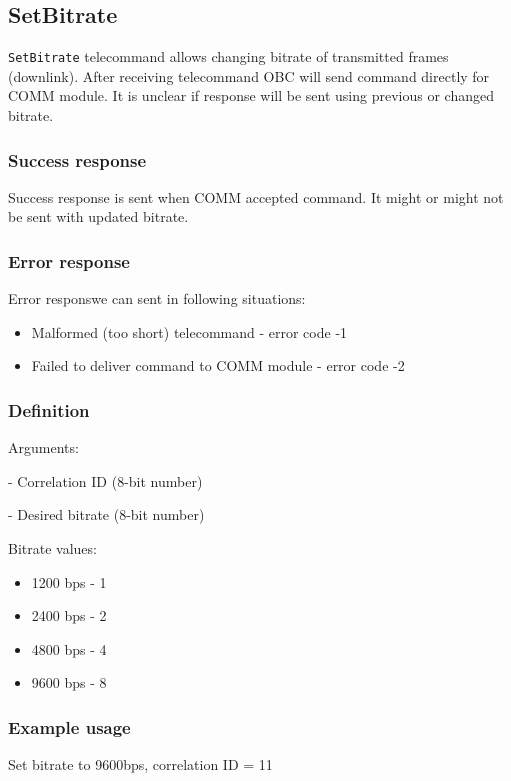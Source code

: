 \subsection{SetBitrate}
\texttt{SetBitrate} telecommand allows changing bitrate of transmitted frames (downlink). After receiving telecommand OBC will send command directly for COMM module. It is unclear if response will be sent using previous or changed bitrate. 

\subsubsection{Success response}
Success response is sent when COMM accepted command. It might or might not be sent with updated bitrate.

\subsubsection{Error response}
Error responswe can sent in following situations:
\begin{itemize}
	\item Malformed (too short) telecommand - error code -1
	\item Failed to deliver command to COMM module - error code -2
\end{itemize}

\subsubsection{Definition}

Arguments: 
\begin{description}[labelindent=1cm]
	\item[\texttt{correlation\_id}] - Correlation ID (8-bit number)
	\item[\texttt{bitrate}] - Desired bitrate (8-bit number) 
\end{description}

Bitrate values:
\begin{itemize}
	\item 1200 bps - 1
	\item 2400 bps - 2
	\item 4800 bps - 4
	\item 9600 bps - 8
\end{itemize}



\subsubsection{Example usage}
Set bitrate to 9600bps, correlation ID = 11



